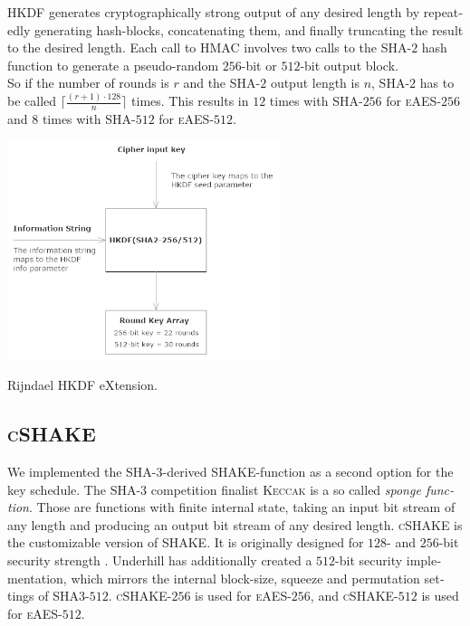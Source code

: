 \documentclass[a4paper,11pt]{article}
\begin{document}
\begin{otherlanguage}{english}
\noindent
\textsc{HKDF} generates cryptographically strong output of any desired length by repeatedly generating hash-blocks, concatenating them, and finally truncating the result to the desired length. 
Each call to \textsc{HMAC} involves two calls to the \textsc{SHA}-$2$ hash function to generate a pseudo-random $256$-bit or $512$-bit output block. \\

\noindent
So if the number of rounds is $r$ and the \textsc{SHA}-$2$ output length is $n$, \textsc{SHA}-$2$ has to be called $\lceil\frac{(r+1)\cdot128}{n}\rceil$ times. This results in $12$ times with \textsc{SHA}-$256$ for \textsc{eAES}-$256$ and $8$ times with \textsc{SHA}-$512$ for \textsc{eAES}-$512$.

\begin{figurehere}
  \centering
  \includegraphics[width=8cm]{RHX-schematic.png}
  \caption{Rijndael HKDF eXtension.\label{abb_3}}
\end{figurehere}

\vspace{0.3cm}

\subsection{\textsc{cSHAKE}}

\noindent
We implemented the \textsc{SHA}-$3$-derived \textsc{SHAKE}-function as a second option for the key schedule. The \textsc{SHA}-$3$ competition finalist \textsc{Keccak} is a so called \textit{sponge function}. Those are functions with finite internal state, taking an input bit stream of any length and producing an output bit stream of any desired length. \textsc{cSHAKE} is the customizable version of \textsc{SHAKE}. It is originally designed for $128$- and $256$-bit security strength \cite{SHK}. Underhill has additionally created a $512$-bit security implementation, which mirrors the internal block-size, squeeze and permutation settings of \textsc{SHA3}-$512$. \textsc{cSHAKE}-$256$ is used for \textsc{eAES}-$256$, and \textsc{cSHAKE}-$512$ is used for \textsc{eAES}-$512$.\\


\end{otherlanguage}
\end{document}
